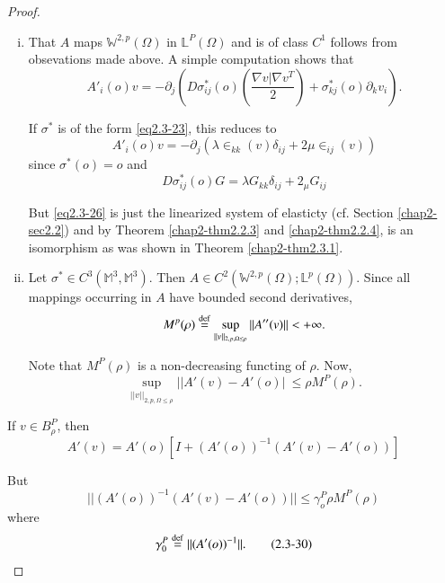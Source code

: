 \begin{proof}
\begin{enumerate}[(i)]
\item That $A$ maps $ \mathbb{W}^{2, p}( \Omega ) $ in $\mathbb{L}^P (
    \Omega)$ and is of class $C^1$ follows from obsevations made
    above. A simple computation shows that  
    $$
    A' _i (o) v = - \partial _j (D \sigma^* _{ij}(o) \left(
    \frac{\nabla v | \nabla v^T}{2}\right)+ \sigma^*_{k j} (o)
    \partial_k v_i ). 
    $$\pageoriginale
    
    If $ \sigma^* $ is of the form \eqref{eq2.3-23}, this reduces to 
    \begin{equation*}
      A'_i (o) v = - \partial_ j ( \lambda \in_{kk} (v ) \delta_{i j}+ 2
      \mu \in _{i j} (v )) \tag{2.3-26} \label{eq2.3-26}
    \end{equation*}
    since $ \sigma^* (o) = o$ and 
    $$
    D \sigma^*_{i j}(o) G = \lambda G_{kk} \delta _{i j} + 2_\mu G_{i j}
    $$

    But \eqref{eq2.3-26} is just the linearized system of elasticty
    (cf. Section \ref{chap2-sec2.2}) and by
    Theorem \ref{chap2-thm2.2.3} 
     and \ref{chap2-thm2.2.4}, is an
    isomorphism as was shown in Theorem \ref{chap2-thm2.3.1}.
 
  \item Let $ \sigma^* \in C^3 ( \mathbb{M}^3, \mathbb{M}^3)$. Then $A \in
    C^2(\mathbb{W}^{2,p}(\Omega ) ; \mathbb{L}^p (\Omega))$.  
    Since all mappings occurring in $A$ have bounded second derivatives, 
    $$
    M^p ( \rho ) \overset{\operatorname{def}}{=} \sup\limits_{|| v ||_{2,p, \Omega \leq
        \rho}} || A''(v )|| < + \infty. 
    $$
    
    Note that $M^P (\rho)$ is a non-decreasing functing of $\rho$. Now,
    \begin{equation*}
      \sup_{|| v || _{2, p , \Omega \leq \rho}}|| A ' ( v ) - A' (o)
      |\ \leq \rho M ^P ( \rho ) .\tag{2.3-27}\label{eq2.3-27} 
    \end{equation*}
  \end{enumerate}

  If $v \in B_\rho ^P$, then
 \begin{equation*}
    A' (v) = A ' ( o) [ I + (A' (o))^{-1}(A' (v)-A' (o))] 
    \tag{2.3-28}\label{eq2.3-28}
    \end{equation*}

But
\begin{equation*}
    || (A'(o))^{-1}(A'(v)-A'(o)) || \leq \gamma_o^P \rho M^P ( \rho )
    \tag{2.3-29}\label{eq2.3-29}
    \end{equation*}
where
\begin{equation*}
\gamma _0 ^ P \overset{\operatorname{def}}{=} || (A' (o
    ))^{-1}||. \tag{2.3-30}\label{eq2.3-30} 
    \end{equation*}
  

\end{proof}
